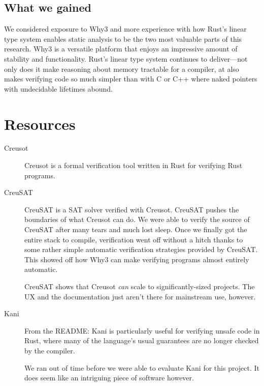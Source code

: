 \documentclass[12pt]{article}
\begin{document}
\subsection{What we gained}

We considered exposure to Why3 and more experience with how Rust's linear type system enables static analysis to be the two most valuable parts of this research.
Why3 is a versatile platform that enjoys an impressive amount of stability and functionality.
Rust's linear type system continues to deliver---not only does it make reasoning about memory tractable for a compiler, at also makes verifying code so much simpler than with C or C++ where naked pointers with undecidable lifetimes abound.

\section{Resources}

\begin{description}
  \item[Creusot] \cite{denisCreusot2023} \cite{denisCreusotFoundryDeductive2022}

    Creusot is a formal verification tool written in Rust for verifying Rust programs.

  \item[CreuSAT] \cite{skotamCreuSAT2023}

    CreuSAT is a SAT solver verified with Creusot.
    CreuSAT pushes the boundaries of what Creusot can do.
    We were able to verify the source of CreuSAT after many tears and much lost sleep.
    Once we finally got the entire stack to compile, verification went off without a hitch thanks to some rather simple automatic verification strategies provided by CreuSAT.
    This showed off how Why3 can make verifying programs almost entirely automatic.

    CreuSAT shows that Creusot \emph{can} scale to significantly-sized projects.
    The UX and the documentation just aren't there for mainstream use, however.

  \item[Kani] \cite{Kani2023}

    From the README: Kani is particularly useful for verifying unsafe code in
    Rust, where many of the language's usual guarantees are no longer checked by
    the compiler.

    We ran out of time before we were able to evaluate Kani for this project.
    It does seem like an intriguing piece of software however.

\end{description}

\clearpage
\printbibliography
\end{document}

